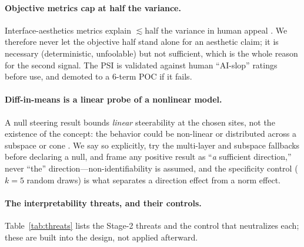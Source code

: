 \paragraph{Objective metrics cap at half the variance.} Interface-aesthetics metrics explain
$\lesssim$half the variance in human appeal \citep{miniukovich2015computation,reinecke2013predicting}.
We therefore never let the objective half stand alone for an aesthetic claim; it is necessary
(deterministic, unfoolable) but not sufficient, which is the whole reason for the second signal. The
PSI is validated against human ``AI-slop'' ratings before use, and demoted to a 6-term POC if it fails.

\paragraph{Diff-in-means is a linear probe of a nonlinear model.} A null steering result bounds
\emph{linear} steerability at the chosen sites, not the existence of the concept: the behavior could be
non-linear \citep{engels2024notlinear} or distributed across a subspace or cone
\citep{wollschlager2025cones}. We say so explicitly, try the multi-layer and subspace fallbacks before
declaring a null, and frame any positive result as ``\emph{a} sufficient direction,'' never ``the''
direction---non-identifiability is assumed, and the specificity control ($k{=}5$ random draws) is what
separates a direction effect from a norm effect.

\paragraph{The interpretability threats, and their controls.} Table~\ref{tab:threats} lists the
Stage-2 threats and the control that neutralizes each; these are built into the design, not applied
afterward.

